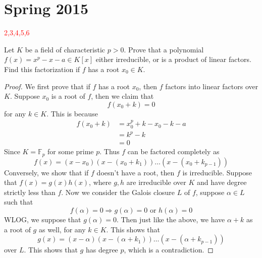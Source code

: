 \documentclass[openany]{book}
\newcommand{\F}{\mathbb{F}}
\begin{document}
\chapter{Spring 2015}

\textcolor{red}{2,3,4,5,6}


\begin{prob}
    Let \(K\) be a field of characteristic \(p>0\). Prove that a polynomial \(f(x)=x^{p}-x-a\in K[x]\) either irreducible, or is a product of linear factors. Find this factorization if \(f\) has a root \(x_{0}\in K\).
\end{prob}
\begin{proof}
    We first prove that if $f$ has a root $x_0$, then $f$ factors into linear factors over $K$. Suppose $x_0$ is a root of $f$, then we claim that 
    \begin{equation*}
        f(x_0+k)=0
    \end{equation*}
    for any $k\in K$. This is because 
    \begin{align*}
        f(x_0+k)&=x_0^p+k-x_0-k-a\\
        &=k^p-k\\
        &=0
    \end{align*}
    Since $K=\F_p$ for some prime $p$. Thus $f$ can be factored completely as 
    \begin{equation*}
        f(x)=(x-x_0)(x-(x_0+k_1))\dots(x-(x_0+k_{p-1}))
    \end{equation*}
    Conversely, we show that if $f$ doesn't have a root, then $f$ is irreducible. Suppose that $f(x)=g(x)h(x)$, where $g,h$ are irreducible over $K$ and have degree strictly less than $f$. Now we consider the Galois closure $L$ of $f$, suppose $\alpha\in L$ such that 
    \begin{equation*}
        f(\alpha)=0\Rightarrow g(\alpha)=0\text{ or } h(\alpha)=0
    \end{equation*}
    WLOG, we suppose that $g(\alpha)=0$. Then just like the above, we have $\alpha+k$ as a root of $g$ as well, for any $k\in K$. This shows that 
    \begin{equation*}
        g(x)=(x-\alpha)(x-(\alpha+k_1))\dots(x-(\alpha+k_{p-1}))
    \end{equation*}
    over $L$. This shows that $g$ has degree $p$, which is a contradiction.
\end{proof}
\end{document}
